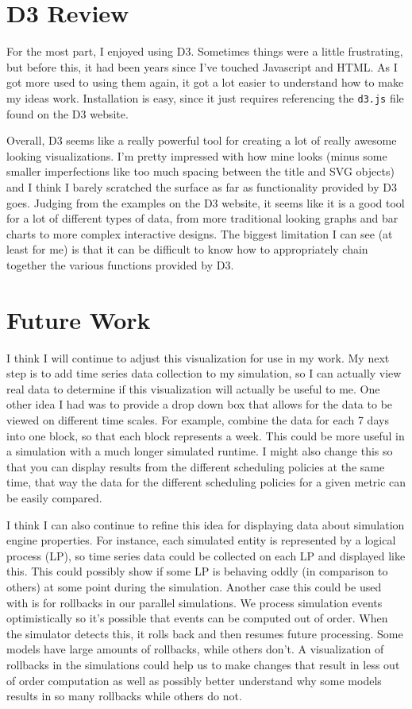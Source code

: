 \documentclass[11pt]{article}
\numberwithin{figure}{section}
\begin{document}
\section{D3 Review}
For the most part, I enjoyed using D3.  Sometimes things were a little frustrating, but before this, it had been years since I've touched Javascript and HTML.  As I got more used to using them again, it got a lot easier to understand how to make my ideas work.  Installation is easy, since it just requires referencing the \texttt{d3.js} file found on the D3 website.  

Overall, D3 seems like a really powerful tool for creating a lot of really awesome looking visualizations.  I'm pretty impressed with how mine looks (minus some smaller imperfections like too much spacing between the title and SVG objects) and I think I barely scratched the surface as far as functionality provided by D3 goes.  Judging from the examples on the D3 website, it seems like it is a good tool for a lot of different types of data, from more traditional looking graphs and bar charts to more complex interactive designs.  The biggest limitation I can see (at least for me) is that it can be difficult to know how to appropriately chain together the various functions provided by D3.

\section{Future Work}
I think I will continue to adjust this visualization for use in my work.  My next step is to add time series data collection to my simulation, so I can actually view real data to determine if this visualization will actually be useful to me.  One other idea I had was to provide a drop down box that allows for the data to be viewed on different time scales.  For example, combine the data for each 7 days into one block, so that each block represents a week.  This could be more useful in a simulation with a much longer simulated runtime. I might also change this so that you can display results from the different scheduling policies at the same time, that way the data for the different scheduling policies for a given metric can be easily compared.  

I think I can also continue to refine this idea for displaying data about simulation engine properties.  For instance, each simulated entity is represented by a logical process (LP), so time series data could be collected on each LP and displayed like this.  This could possibly show if some LP is behaving oddly (in comparison to others) at some point during the simulation.  Another case this could be used with is for rollbacks in our parallel simulations.  We process simulation events optimistically so it's possible that events can be computed out of order.  When the simulator detects this, it rolls back and then resumes future processing.  Some models have large amounts of rollbacks, while others don't.  A visualization of rollbacks in the simulations could help us to make changes that result in less out of order computation as well as possibly better understand why some models results in so many rollbacks while others do not.  


%

%
\end{document}
